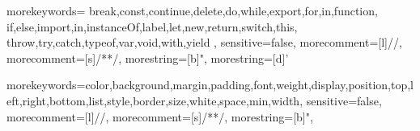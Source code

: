 \renewcommand{\familydefault}{\sfdefault}
\usepackage[ngerman,english]{babel}
\usepackage{avant} 
\usepackage[a4paper, margin=3cm]{geometry}
\usepackage{tikz}
\usepackage{svg}
\usetikzlibrary{calc,shapes.multipart,chains,arrows}
\usepackage{fancyhdr}
\usepackage{etoolbox}
\pagestyle{fancy}
\renewcommand{\thispagestyle}[1]{} %
\makeatletter
\patchcmd{\headrule}{\hrule}{\color{hdm}\hrule}{}{}
\patchcmd{\footrule}{\hrule}{\color{hdm}\hrule}{}{}
\makeatother

\renewcommand{\headrulewidth}{1.2pt}
\renewcommand{\footrulewidth}{0.4pt}
\cfoot{\thepage}

\usepackage{hyperref}
\hypersetup{ colorlinks = true, linkcolor = black, urlcolor = hdm, citecolor = black }
\setlength{\parindent}{0mm}
\setlength{\parskip}{0.7em}
\usepackage[export]{adjustbox}
\usepackage{MnSymbol}
\usepackage{listingsutf8}
\usepackage{courier}
\lstset{inputencoding=utf8}

\lstset{
  basicstyle=\footnotesize\ttfamily,
  breaklines=true,
  showstringspaces=false,
}

 {
	morekeywords={
		break,const,continue,delete,do,while,export,for,in,function,
		if,else,import,in,instanceOf,label,let,new,return,switch,this,
		throw,try,catch,typeof,var,void,with,yield
	},
	sensitive=false,
	morecomment=[l]{//},
	morecomment=[s]{/*}{*/},
	morestring=[b]",
	morestring=[d]'
}

 {
  morekeywords={color,background,margin,padding,font,weight,display,position,top,left,right,bottom,list,style,border,size,white,space,min,width},
  sensitive=false,
  morecomment=[l]{//},
  morecomment=[s]{/*}{*/},
  morestring=[b]",
}

